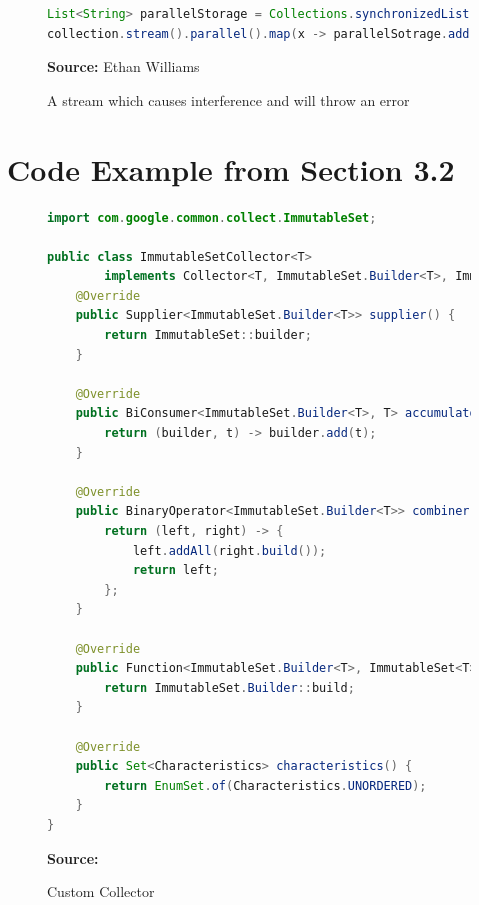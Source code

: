\documentclass[oneside, 12pt]{article}
\newcommand{\source}[1]{\textbf{Source:} {#1} }
\begin{document}
\begin{figure}[H]
\centering
\begin{lstlisting}[language=Java]
List<String> parallelStorage = Collections.synchronizedList(new ArrayList<>());
collection.stream().parallel().map(x -> parallelSotrage.add(x)).forEachOrdered(x -> System.out.println(x));
\end{lstlisting}
\caption{A stream which causes interference and will throw an error}
\source{Ethan Williams}
\label{fig:stateful}
\end{figure}
 
\printbibliography[heading=bibintoc]

\appendix
\section{Code Example from Section 3.2}
\begin{figure}[H]
\centering
\begin{lstlisting}[language=Java]
import com.google.common.collect.ImmutableSet;
 
public class ImmutableSetCollector<T> 
        implements Collector<T, ImmutableSet.Builder<T>, ImmutableSet<T>> {
    @Override
    public Supplier<ImmutableSet.Builder<T>> supplier() {
        return ImmutableSet::builder;
    }
 
    @Override
    public BiConsumer<ImmutableSet.Builder<T>, T> accumulator() {
        return (builder, t) -> builder.add(t);
    }
 
    @Override
    public BinaryOperator<ImmutableSet.Builder<T>> combiner() {
        return (left, right) -> {
            left.addAll(right.build());
            return left;
        };
    }
 
    @Override
    public Function<ImmutableSet.Builder<T>, ImmutableSet<T>> finisher() {
        return ImmutableSet.Builder::build;
    }
 
    @Override
    public Set<Characteristics> characteristics() {
        return EnumSet.of(Characteristics.UNORDERED);
    }
}
\end{lstlisting}
\caption{Custom Collector }
\source{\autocite{custom_collector}}
\label{fig:collector_impl}
\end{figure}
\end{document}
